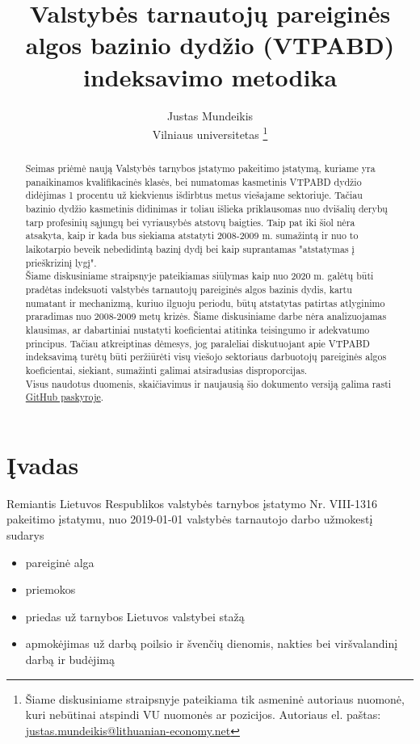 \documentclass[titlepage, 11pt]{article}
\author{Justas Mundeikis\\ Vilniaus universitetas \footnote{Šiame diskusiniame straipsnyje pateikiama tik asmeninė autoriaus nuomonė, kuri nebūtinai atspindi VU nuomonės ar pozicijos. Autoriaus el. paštas: \href{mailto: justas.mundeikis@lithuanian-economy.net}{justas.mundeikis@lithuanian-economy.net} }}
\title{Valstybės tarnautojų pareiginės algos bazinio dydžio (VTPABD) \\ indeksavimo metodika}
\begin{document}
\maketitle


\begin{abstract}
Seimas priėmė naują Valstybės tarnybos įstatymo pakeitimo įstatymą, kuriame yra panaikinamos kvalifikacinės klasės, bei numatomas kasmetinis VTPABD dydžio didėjimas 1 procentu už kiekvienus išdirbtus metus viešajame sektoriuje. Tačiau bazinio dydžio kasmetinis didinimas ir toliau išlieka priklausomas nuo dvišalių derybų tarp profesinių sąjungų bei vyriausybės atstovų baigties. Taip pat iki šiol nėra atsakyta, kaip ir kada bus siekiama atstatyti 2008-2009 m. sumažintą ir nuo to laikotarpio beveik nebedidintą bazinį dydį bei kaip suprantamas "atstatymas į prieškrizinį lygį".\\ 
Šiame diskusiniame straipsnyje pateikiamas siūlymas kaip nuo 2020 m. galėtų būti pradėtas indeksuoti valstybės tarnautojų pareiginės algos bazinis dydis, kartu numatant ir mechanizmą, kuriuo ilguoju periodu, būtų atstatytas patirtas atlyginimo praradimas nuo 2008-2009 metų krizės. Šiame diskusiniame darbe nėra analizuojamas klausimas, ar dabartiniai nustatyti koeficientai atitinka teisingumo ir adekvatumo principus. Tačiau atkreiptinas dėmesys, jog paraleliai diskutuojant apie VTPABD indeksavimą turėtų būti peržiūrėti visų viešojo sektoriaus darbuotojų pareiginės algos koeficientai, siekiant, sumažinti galimai atsiradusias disproporcijas.\\
Visus naudotus duomenis, skaičiavimus ir naujausią šio dokumento versiją galima rasti \href{https://github.com/justasmundeikis/VTPABD}{GitHub paskyroje}.
\end{abstract}

\tableofcontents
\newpage

\section{Įvadas}
Remiantis Lietuvos Respublikos valstybės tarnybos įstatymo Nr. VIII-1316 pakeitimo įstatymu, nuo 2019-01-01 valstybės tarnautojo darbo užmokestį sudarys 
\begin{itemize}
\setlength\itemsep{-0.5em}
\item pareiginė alga
\item priemokos
\item priedas už tarnybos Lietuvos valstybei stažą
\item apmokėjimas už darbą poilsio ir švenčių dienomis, nakties bei viršvalandinį darbą ir budėjimą
\end{itemize}
\end{document}

